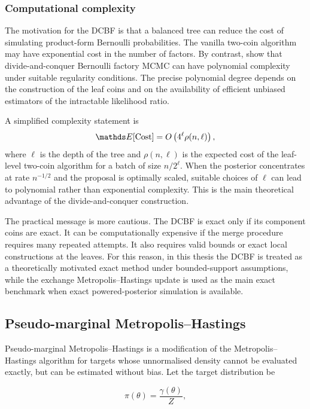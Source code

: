\subsubsection{Computational complexity}

The motivation for the DCBF is that a balanced tree can reduce the cost of simulating product-form Bernoulli probabilities.
The vanilla two-coin algorithm may have exponential cost in the number of factors.
By contrast, \cite{stumpf2025} show that divide-and-conquer Bernoulli factory MCMC can have polynomial complexity under suitable regularity conditions.
The precise polynomial degree depends on the construction of the leaf coins and on the availability of efficient unbiased estimators of the intractable likelihood ratio.

A simplified complexity statement is
\begin{equation}
\bE[\mathrm{Cost}]
=
O
\left(
4^\ell \rho(n,\ell)
\right),
\end{equation}
where $\ell$ is the depth of the tree and $\rho(n,\ell)$ is the expected cost of the leaf-level two-coin algorithm for a batch of size $n/2^\ell$.
When the posterior concentrates at rate $n^{-1/2}$ and the proposal is optimally scaled, suitable choices of $\ell$ can lead to polynomial rather than exponential complexity.
This is the main theoretical advantage of the divide-and-conquer construction.

The practical message is more cautious.
The DCBF is exact only if its component coins are exact.
It can be computationally expensive if the merge procedure requires many repeated attempts.
It also requires valid bounds or exact local constructions at the leaves.
For this reason, in this thesis the DCBF is treated as a theoretically motivated exact method under bounded-support assumptions, while the exchange Metropolis--Hastings update is used as the main exact benchmark when exact powered-posterior simulation is available.

\subsection{Pseudo-marginal Metropolis--Hastings}

Pseudo-marginal Metropolis--Hastings is a modification of the Metropolis--Hastings algorithm for targets whose unnormalised density cannot be evaluated exactly, but can be estimated without bias.
Let the target distribution be

\begin{equation}
    \pi(\theta)
    =
    \dfrac{\gamma(\theta)}{Z},
\end{equation}

